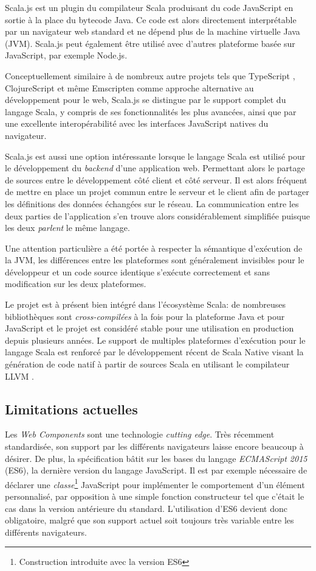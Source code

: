 Scala.js est un plugin du compilateur Scala produisant du code JavaScript en sortie à la place du bytecode Java. Ce code est alors directement interprétable par un navigateur web standard et ne dépend plus de la machine virtuelle Java (JVM). Scala.js peut également être utilisé avec d'autres plateforme basée sur JavaScript, par exemple Node.js.

Conceptuellement similaire à de nombreux autre projets tels que TypeScript \cite{typescript}, ClojureScript \cite{clojure-script} et même Emscripten \cite{emscripten} comme approche alternative au développement pour le web, Scala.js se distingue par le support complet du langage Scala, y compris de ses fonctionnalités les plus avancées, ainsi que par une excellente interopérabilité avec les interfaces JavaScript natives du navigateur.

Scala.js est aussi une option intéressante lorsque le langage Scala est utilisé pour le développement du \emph{backend} d'une application web. Permettant alors le partage de sources entre le développement côté client et côté serveur. Il est alors fréquent de mettre en place un projet commun entre le serveur et le client afin de partager les définitions des données échangées sur le réseau. La communication entre les deux parties de l'application s'en trouve alors considérablement simplifiée puisque les deux \emph{parlent} le même langage.

Une attention particulière a été portée à respecter la sémantique d'exécution de la JVM, les différences entre les plateformes sont généralement invisibles pour le développeur et un code source identique s'exécute correctement et sans modification sur les deux plateformes.

Le projet est à présent bien intégré dans l'écosystème Scala: de nombreuses bibliothèques sont \emph{cross-compilées} à la fois pour la plateforme Java et pour JavaScript et le projet est considéré stable pour une utilisation en production depuis plusieurs années. Le support de multiples plateformes d'exécution pour le langage Scala est renforcé par le développement récent de Scala Native \cite{scalanative} visant la génération de code natif à partir de sources Scala en utilisant le compilateur LLVM \cite{llvm}.

\subsection{Limitations actuelles}

Les \emph{Web Components} sont une technologie \emph{cutting edge}. Très récemment standardisée, son support par les différents navigateurs laisse encore beaucoup à désirer. De plus, la spécification bâtit sur les bases du langage \emph{ECMAScript 2015} (ES6), la dernière version du langage JavaScript. Il est par exemple nécessaire de déclarer une \emph{classe}\footnote{Construction introduite avec la version ES6} JavaScript pour implémenter le comportement d'un élément personnalisé, par opposition à une simple fonction constructeur tel que c'était le cas dans la version antérieure du standard. L'utilisation d'ES6 devient donc obligatoire, malgré que son support actuel soit toujours très variable entre les différents navigateurs.

